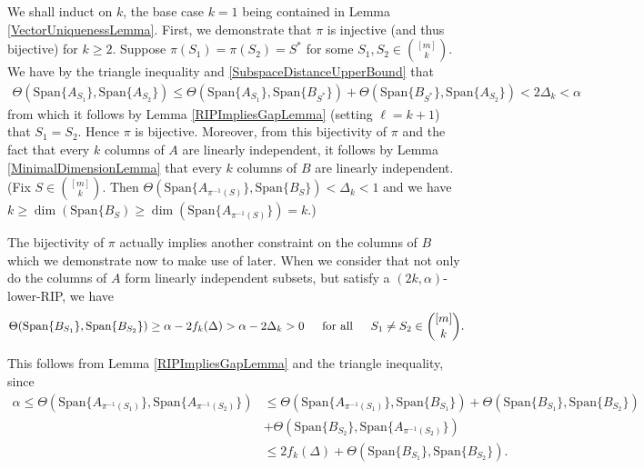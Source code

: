 \documentclass[journal,onecolumn]{IEEEtran}
\begin{document}
We shall induct on $k$, the base case $k=1$ being contained in Lemma \ref{VectorUniquenessLemma}. First, we demonstrate that $\pi$ is injective (and thus bijective) for $k \geq 2$. Suppose $\pi(S_1) = \pi(S_2) = S^*$ for some $S_1, S_2 \in {[m] \choose k}$. We have by the triangle inequality and \eqref{SubspaceDistanceUpperBound} that
\begin{align*}
\Theta(\text{Span}\{A_{S_1}\}, \text{Span}\{A_{S_2}\}) 
\leq \Theta(\text{Span}\{A_{S_1}\}, \text{Span}\{B_{S^*}\}) + \Theta(\text{Span}\{B_{S^*}\}, \text{Span}\{A_{S_2}\}) < 2\Delta_k < \alpha
\end{align*}
%
from which it follows by Lemma \ref{RIPImpliesGapLemma} (setting $\ell = k+1$) that $S_1 = S_2$. Hence $\pi$ is bijective. Moreover, from this bijectivity of $\pi$ and the fact that every $k$ columns of $A$ are linearly independent, it follows by Lemma \ref{MinimalDimensionLemma} that every $k$ columns of $B$ are linearly independent. (Fix $S \in {[m] \choose k}$. Then $\Theta(\text{Span}\{A_{\pi^{-1}(S)}\}, \text{Span}\{B_{S}\}) < \Delta_k < 1$ and we have $k \geq \dim(\text{Span}\{B_{S}) \geq \dim(\text{Span}\{A_{\pi^{-1}(S)}\}) = k$.)

The bijectivity of $\pi$ actually implies another constraint on the columns of $B$ which we demonstrate now to make use of later. When we consider that not only do the columns of $A$ form linearly independent subsets, but satisfy a $(2k,\alpha)$-lower-RIP, we have
\begin{align}\label{Bprop1}
\Theta(\text{Span}\{B_{S_1}\}, \text{Span}\{B_{S_2}\}) \geq \alpha - 2f_k(\Delta) > \alpha - 2\Delta_k > 0 \indent \text{for all} \indent S_1 \neq S_2 \in {[m] \choose k}.
\end{align}

This follows from Lemma \ref{RIPImpliesGapLemma} and the triangle inequality, since
\begin{align*}
\alpha \leq \Theta(\text{Span}\{A_{\pi^{-1}(S_1)}\}, \text{Span}\{A_{\pi^{-1}(S_2)}\}) &\leq \Theta(\text{Span}\{A_{\pi^{-1}(S_1)}\}, \text{Span}\{B_{S_1}\})
+ \Theta(\text{Span}\{B_{S_1}\}, \text{Span}\{B_{S_2}\}) \\
&+ \Theta(\text{Span}\{B_{S_2}\}, \text{Span}\{A_{\pi^{-1}(S_2)}\}) \\
 &\leq 2f_k(\Delta) + \Theta(\text{Span}\{B_{S_1}\}, \text{Span}\{B_{S_2}\}).
\end{align*}
\end{document}
